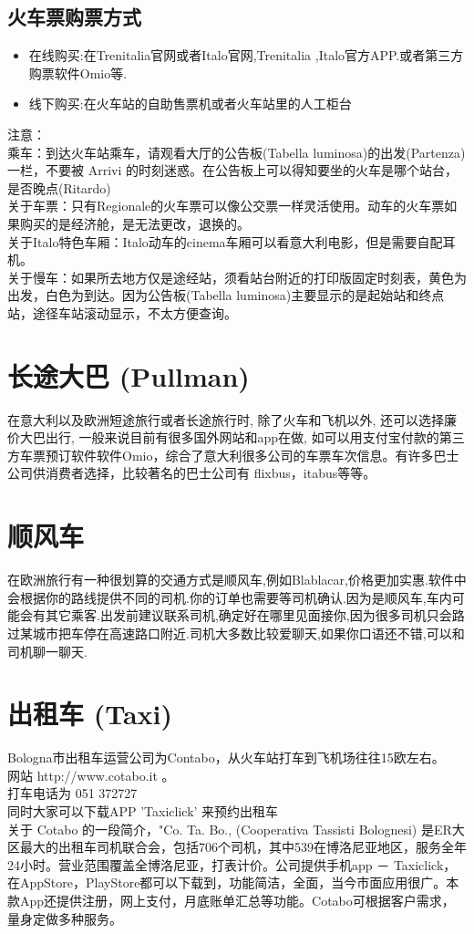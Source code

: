 \subsection{火车票购票方式}
\begin{itemize}
\item 在线购买:在Trenitalia官网或者Italo官网,Trenitalia ,Italo官方APP.或者第三方购票软件Omio等.
\item 线下购买:在火车站的自助售票机或者火车站里的人工柜台
\end{itemize}
注意：\\
乘车：到达火车站乘车，请观看大厅的公告板(Tabella luminosa)的出发(Partenza)一栏，不要被 Arrivi 的时刻迷惑。在公告板上可以得知要坐的火车是哪个站台，是否晚点(Ritardo) \\
关于车票：只有Regionale的火车票可以像公交票一样灵活使用。动车的火车票如果购买的是经济舱，是无法更改，退换的。\\
关于Italo特色车厢：Italo动车的cinema车厢可以看意大利电影，但是需要自配耳机。\\
关于慢车：如果所去地方仅是途经站，须看站台附近的打印版固定时刻表，黄色为出发，白色为到达。因为公告板(Tabella luminosa)主要显示的是起始站和终点站，途径车站滚动显示，不太方便查询。\\

\section{长途大巴 (Pullman)}
在意大利以及欧洲短途旅行或者长途旅行时, 除了火车和飞机以外, 还可以选择廉价大巴出行, 一般来说目前有很多国外网站和app在做, 如可以用支付宝付款的第三方车票预订软件软件Omio，综合了意大利很多公司的车票车次信息。有许多巴士公司供消费者选择，比较著名的巴士公司有 flixbus，itabus等等。

\section{顺风车}
在欧洲旅行有一种很划算的交通方式是顺风车,例如Blablacar,价格更加实惠.软件中会根据你的路线提供不同的司机.你的订单也需要等司机确认.因为是顺风车,车内可能会有其它乘客.出发前建议联系司机,确定好在哪里见面接你,因为很多司机只会路过某城市把车停在高速路口附近.司机大多数比较爱聊天,如果你口语还不错,可以和司机聊一聊天.

\section{出租车 (Taxi)}
Bologna市出租车运营公司为Contabo，从火车站打车到飞机场往往15欧左右。\\
网站 http://www.cotabo.it 。\\
打车电话为 051 372727 \\
同时大家可以下载APP 'Taxiclick' 来预约出租车\\
关于 Cotabo 的一段简介，"Co. Ta. Bo., (Cooperativa Tassisti Bolognesi) 是ER大区最大的出租车司机联合会，包括706个司机，其中539在博洛尼亚地区，服务全年24小时。营业范围覆盖全博洛尼亚，打表计价。公司提供手机app － Taxiclick，在AppStore，PlayStore都可以下载到，功能简洁，全面，当今市面应用很广。本款App还提供注册，网上支付，月底账单汇总等功能。Cotabo可根据客户需求，量身定做多种服务。


